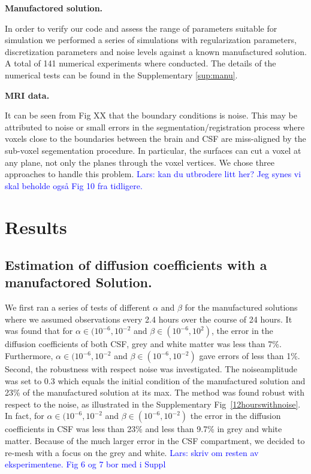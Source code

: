 \documentclass[12pt,a4paper]{article}
\newcommand{\kam}[1]{\textcolor{blue}{#1}}
\begin{document}
\textbf{Manufactored solution.}

In order to verify our code and assess the range of parameters suitable for simulation we performed a series of 
simulations with regularization parameters, discretization parameters and noise levels against a 
known manufactured solution. A total of 141 numerical experiments
where conducted. The details of the numerical tests can be found in the Supplementary \ref{sup:manu}. 

\textbf{MRI data.}

It can be seen from Fig XX that the boundary conditions is noise. This may be attributed to noise or small errors
in the segmentation/registration process where voxels close to the boundaries between the brain and CSF are miss-aligned
by the sub-voxel segementation procedure. In particular, the surfaces can cut a voxel at any plane, not only the planes
through the voxel vertices. We chose three approaches to handle this problem. \kam{Lars: kan du utbrodere litt her? 
Jeg synes vi skal beholde også Fig 10 fra tidligere.  }   




\section{Results}

\subsection{Estimation of diffusion coefficients with a manufactored Solution.} 
We first ran a series of tests of different $\alpha$ and $\beta$ for the manufactured solutions where we assumed observations every 2.4 hours
over the course of 24 hours. It was found that for $\alpha \in (10^{-6}, 10^{-2}$ and $\beta\in(10^{-6}, 10^2)$, the error in 
the diffusion coefficients of both CSF, grey and white matter was less than 7\%. Furthermore,  
$\alpha \in (10^{-6}, 10^{-2}$ and $\beta\in(10^{-6}, 10^{-2})$ gave errors of less than 1\%. Second, the robustness with respect noise
was investigated. The noiseamplitude was set to 0.3 which equals the initial condition of the manufactured solution
and 23\% of the manufactured solution at its max. The method was found robust with respect to the noise, as illustrated in the Supplementary Fig~\ref{12hourswithnoise}.  In fact, for  $\alpha \in (10^{-6}, 10^{-2}$ and $\beta\in(10^{-6}, 10^{-2})$ the error in the diffusion coefficients in CSF was less than 23\% and less than 9.7\% in grey and white matter. Because of the much larger 
error in the CSF compartment, we decided to re-mesh with a focus on the grey and white. \kam{Lars: skriv om resten av eksperimentene. Fig 6 og 7 bor med i Suppl}   
\end{document}

